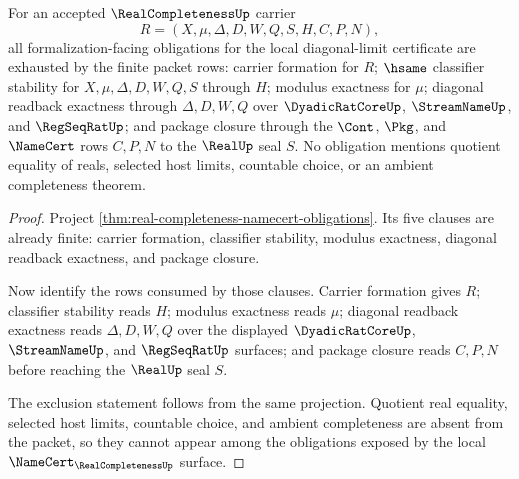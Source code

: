 \begin{theorem}
\label{thm:real-completeness-finite-obligation-surface}
For an accepted $\RealCompletenessUp$ carrier
$$
R=(X,\mu,\Delta,D,W,Q,S,H,C,P,N),
$$
all formalization-facing obligations for the local diagonal-limit certificate are exhausted by the finite packet rows: carrier formation for $R$; $\hsame$ classifier stability for $X,\mu,\Delta,D,W,Q,S$ through $H$; modulus exactness for $\mu$; diagonal readback exactness through $\Delta,D,W,Q$ over $\DyadicRatCoreUp$, $\StreamNameUp$, and $\RegSeqRatUp$; and package closure through the $\Cont$, $\Pkg$, and $\NameCert$ rows $C,P,N$ to the $\RealUp$ seal $S$. No obligation mentions quotient equality of reals, selected host limits, countable choice, or an ambient completeness theorem.
\end{theorem}
\begin{proof}
Project \autoref{thm:real-completeness-namecert-obligations}. Its five clauses are already finite: carrier formation, classifier stability, modulus exactness, diagonal readback exactness, and package closure.

Now identify the rows consumed by those clauses. Carrier formation gives $R$; classifier stability reads $H$; modulus exactness reads $\mu$; diagonal readback exactness reads $\Delta,D,W,Q$ over the displayed $\DyadicRatCoreUp$, $\StreamNameUp$, and $\RegSeqRatUp$ surfaces; and package closure reads $C,P,N$ before reaching the $\RealUp$ seal $S$.

The exclusion statement follows from the same projection. Quotient real equality, selected host limits, countable choice, and ambient completeness are absent from the packet, so they cannot appear among the obligations exposed by the local $\NameCert_{\RealCompletenessUp}$ surface.
\end{proof}

